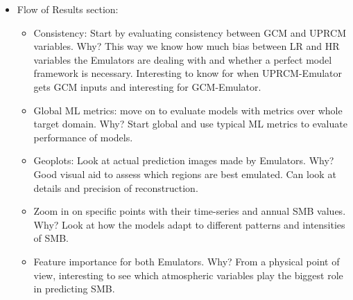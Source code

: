 \documentclass[a4paper,11pt,oneside]{report}
\begin{document}
\begin{itemize}
    \item Flow of Results section:
    \begin{itemize}
    \item Consistency: Start by evaluating consistency between GCM and UPRCM variables. Why? This way we know how much bias between LR and HR variables the Emulators are dealing with and whether a perfect model framework is necessary. Interesting to know for when UPRCM-Emulator gets GCM inputs and interesting for GCM-Emulator. 
        \item Global ML metrics: move on to evaluate models with metrics over whole target domain. Why? Start global and use typical ML metrics to evaluate performance of models.  
        \item Geoplots: Look at actual prediction images made by Emulators. Why? Good visual aid to assess which regions are best emulated. Can look at details and precision of reconstruction.   
        \item Zoom in on specific points with their time-series and annual SMB values. Why? Look at how the models adapt to different patterns and intensities of SMB. 
        \item Feature importance for both Emulators. Why? From a physical point of view, interesting to see which atmospheric variables play the biggest role in predicting SMB. 
        
    \end{itemize} 
\end{itemize}
\end{document}
